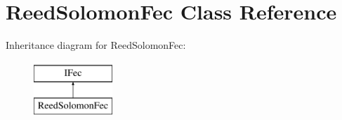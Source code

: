 \hypertarget{classefb_1_1ReedSolomonFec}{
\section{ReedSolomonFec Class Reference}
\label{classefb_1_1ReedSolomonFec}
}
Inheritance diagram for ReedSolomonFec:\begin{figure}[H]
\begin{center}
\leavevmode
\includegraphics[height=2.000000cm]{classefb_1_1ReedSolomonFec}
\end{center}
\end{figure}
